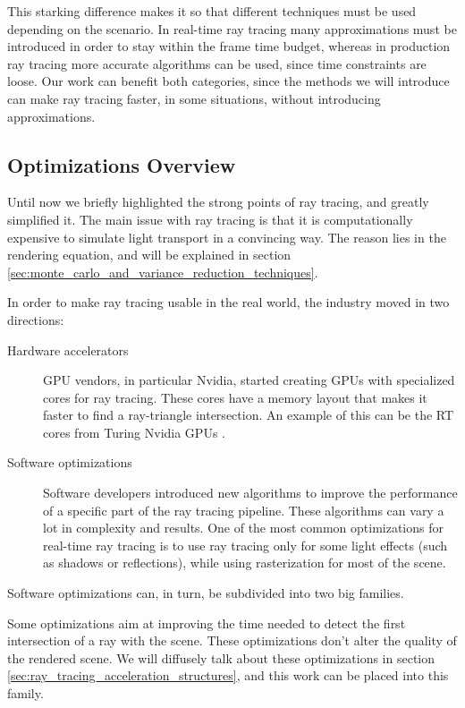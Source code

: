 \documentclass{PoliMi_MasterThesis}
\begin{document}
This starking difference makes it so that different techniques must be used depending on the scenario. In real-time ray tracing many approximations must be introduced in order to stay within the frame time budget, whereas in production ray tracing more accurate algorithms can be used, since time constraints are loose. Our work can benefit both categories, since the methods we will introduce can make ray tracing faster, in some situations, without introducing approximations.

\subsection{Optimizations Overview} \label{ssec:optimizations_overview}
Until now we briefly highlighted the strong points of ray tracing, and greatly simplified it. The main issue with ray tracing is that it is computationally expensive to simulate light transport in a convincing way. The reason lies in the rendering equation, and will be explained in section \ref{sec:monte_carlo_and_variance_reduction_techniques}.

In order to make ray tracing usable in the real world, the industry moved in two directions:
\begin{description}
	\item [Hardware accelerators] GPU vendors, in particular Nvidia, started creating GPUs with specialized cores for ray tracing. These cores have a memory layout that makes it faster to find a ray-triangle intersection. An example of this can be the RT cores from Turing Nvidia GPUs \cite{rt_cores}.
	\item [Software optimizations] Software developers introduced new algorithms to improve the performance of a specific part of the ray tracing pipeline. These algorithms can vary a lot in complexity and results. One of the most common optimizations for real-time ray tracing is to use ray tracing only for some light effects (such as shadows or reflections), while using rasterization for most of the scene.
\end{description}

Software optimizations can, in turn, be subdivided into two big families.

Some optimizations aim at improving the time needed to detect the first intersection of a ray with the scene. These optimizations don't alter the quality of the rendered scene. We will diffusely talk about these optimizations in section \ref{sec:ray_tracing_acceleration_structures}, and this work can be placed into this family.
\end{document}

